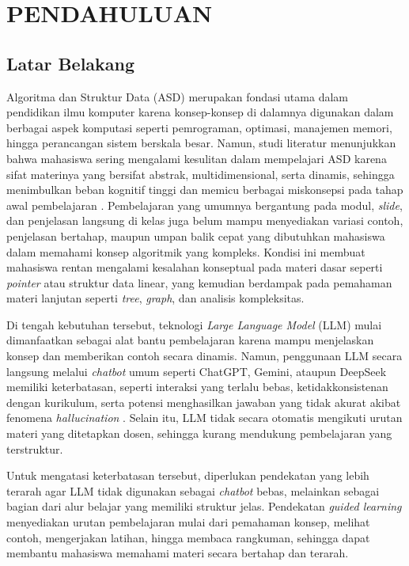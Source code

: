 
\chapter{PENDAHULUAN}
\label{chap:pendahuluan}

\section{Latar Belakang}

Algoritma dan Struktur Data (ASD) merupakan fondasi utama dalam pendidikan ilmu komputer karena konsep-konsep di dalamnya digunakan dalam berbagai aspek komputasi seperti pemrograman, optimasi, manajemen memori, hingga perancangan sistem berskala besar. Namun, studi literatur menunjukkan bahwa mahasiswa sering mengalami kesulitan dalam mempelajari ASD karena sifat materinya yang bersifat abstrak, multidimensional, serta dinamis, sehingga menimbulkan beban kognitif tinggi dan memicu berbagai miskonsepsi pada tahap awal pembelajaran \cite{Mtaho2024}. Pembelajaran yang umumnya bergantung pada modul, \textit{slide}, dan penjelasan langsung di kelas juga belum mampu menyediakan variasi contoh, penjelasan bertahap, maupun umpan balik cepat yang dibutuhkan mahasiswa dalam memahami konsep algoritmik yang kompleks. Kondisi ini membuat mahasiswa rentan mengalami kesalahan konseptual pada materi dasar seperti \textit{pointer} atau struktur data linear, yang kemudian berdampak pada pemahaman materi lanjutan seperti \textit{tree}, \textit{graph}, dan analisis kompleksitas.

Di tengah kebutuhan tersebut, teknologi \textit{Large Language Model} (LLM) mulai dimanfaatkan sebagai alat bantu pembelajaran karena mampu menjelaskan konsep dan memberikan contoh secara dinamis. Namun, penggunaan LLM secara langsung melalui \textit{chatbot} umum seperti ChatGPT, Gemini, ataupun DeepSeek memiliki keterbatasan, seperti interaksi yang terlalu bebas, ketidakkonsistenan dengan kurikulum, serta potensi menghasilkan jawaban yang tidak akurat akibat fenomena \textit{hallucination} \cite{Raihan2024}. Selain itu, LLM tidak secara otomatis mengikuti urutan materi yang ditetapkan dosen, sehingga kurang mendukung pembelajaran yang terstruktur.

Untuk mengatasi keterbatasan tersebut, diperlukan pendekatan yang lebih terarah agar LLM tidak digunakan sebagai \textit{chatbot} bebas, melainkan sebagai bagian dari alur belajar yang memiliki struktur jelas. Pendekatan \textit{guided learning} menyediakan urutan pembelajaran mulai dari pemahaman konsep, melihat contoh, mengerjakan latihan, hingga membaca rangkuman, sehingga dapat membantu mahasiswa memahami materi secara bertahap dan terarah.

